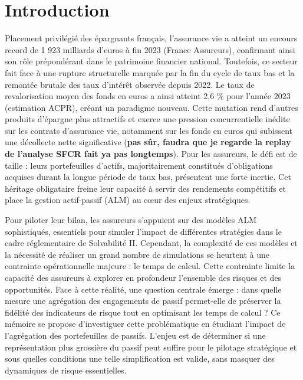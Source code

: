 \chapter*{Introduction}

Placement privilégié des épargnants français, l'assurance vie a atteint un encours record de 1 923 milliards d'euros à fin 2023 (France Assureurs), confirmant ainsi son rôle prépondérant dans le patrimoine financier national. Toutefois, ce secteur fait face à une rupture structurelle marquée par la fin du cycle de taux bas et la remontée brutale des taux d'intérêt observée depuis 2022. Le taux de revalorisation moyen des fonds en euros a ainsi atteint 2,6 \% pour l'année 2023 (estimation ACPR), créant un paradigme nouveau. Cette mutation rend d'autres produits d'épargne plus attractifs et exerce une pression concurrentielle inédite sur les contrats d'assurance vie, notamment sur les fonds en euros qui subissent une décollecte nette significative (\textbf{pas sûr, faudra que je regarde la replay de l'analyse SFCR fait ya pas longtemps}). Pour les assureurs, le défi est de taille : leurs portefeuilles d'actifs, majoritairement constitués d'obligations acquises durant la longue période de taux bas, présentent une forte inertie. Cet héritage obligataire freine leur capacité à servir des rendements compétitifs et place la gestion actif-passif (ALM) au cœur des enjeux stratégiques.\newline{}

Pour piloter leur bilan, les assureurs s'appuient sur des modèles ALM sophistiqués, essentiels pour simuler l'impact de différentes stratégies dans le cadre réglementaire de Solvabilité II. Cependant, la complexité de ces modèles et la nécessité de réaliser un grand nombre de simulations se heurtent à une contrainte opérationnelle majeure : le temps de calcul. Cette contrainte limite la capacité des assureurs à explorer en profondeur l'ensemble des risques et des opportunités. Face à cette réalité, une question centrale émerge : dans quelle mesure une agrégation des engagements de passif permet-elle de préserver la fidélité des indicateurs de risque tout en optimisant les temps de calcul ? Ce mémoire se propose d'investiguer cette problématique en étudiant l'impact de l'agrégation des portefeuilles de passifs. L'enjeu est de déterminer si une représentation plus grossière du passif peut suffire pour le pilotage stratégique et sous quelles conditions une telle simplification est valide, sans masquer des dynamiques de risque essentielles.\newline{}

